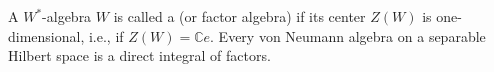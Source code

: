 A $W^*$-algebra $W$ is called a  (or factor algebra) if its center $Z(W)$ is one-dimensional, i.e., if $Z(W) = \mathbb{C} e$. Every von Neumann algebra on a separable Hilbert space is a direct integral of factors.
